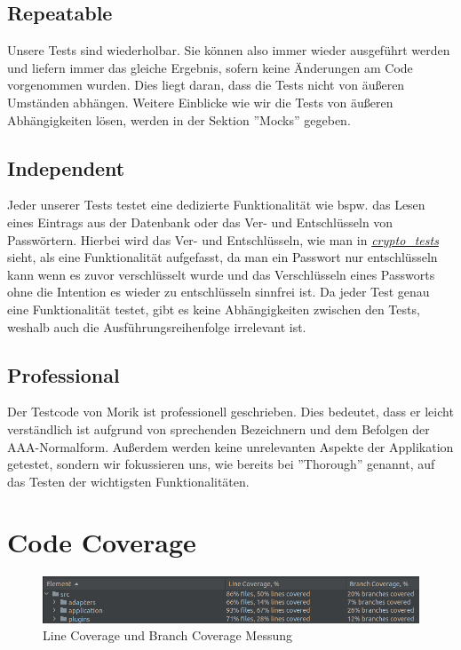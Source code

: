 \subsection{Repeatable}
Unsere Tests sind wiederholbar. Sie können also immer wieder ausgeführt werden und liefern immer das gleiche Ergebnis, sofern keine Änderungen am Code vorgenommen wurden. Dies liegt daran, dass die Tests nicht von äußeren Umständen abhängen. Weitere Einblicke wie wir die Tests von äußeren Abhängigkeiten lösen, werden in der Sektion ''Mocks'' gegeben.

\subsection{Independent}
Jeder unserer Tests testet eine dedizierte Funktionalität wie bspw. das Lesen eines Eintrags aus der Datenbank oder das Ver- und Entschlüsseln von Passwörtern. Hierbei wird das Ver- und Entschlüsseln, wie man in \href{https://github.com/moorts/Morik/blob/main/src/tests/plugins/encryption/crypto_tests.cpp}{\textit{crypto\_tests}} sieht, als eine Funktionalität aufgefasst, da man ein Passwort nur entschlüsseln kann wenn es zuvor verschlüsselt wurde und das Verschlüsseln eines Passworts ohne die Intention es wieder zu entschlüsseln sinnfrei ist. Da jeder Test genau eine Funktionalität testet, gibt es keine Abhängigkeiten zwischen den Tests, weshalb auch die Ausführungsreihenfolge irrelevant ist.

\subsection{Professional}
Der Testcode von Morik ist professionell geschrieben. Dies bedeutet, dass er leicht verständlich ist aufgrund von sprechenden Bezeichnern und dem Befolgen der AAA-Normalform. Außerdem werden keine unrelevanten Aspekte der Applikation getestet, sondern wir fokussieren uns, wie bereits bei ''Thorough'' genannt, auf das Testen der wichtigsten Funktionalitäten.

\section{Code Coverage}
\begin{figure}[ht]
	\centering
	\includegraphics[width=1.0\textwidth]{Bilder/coverage.png}
	\caption{Line Coverage und Branch Coverage Messung}
	\label{fig:coverage}
\end{figure}

